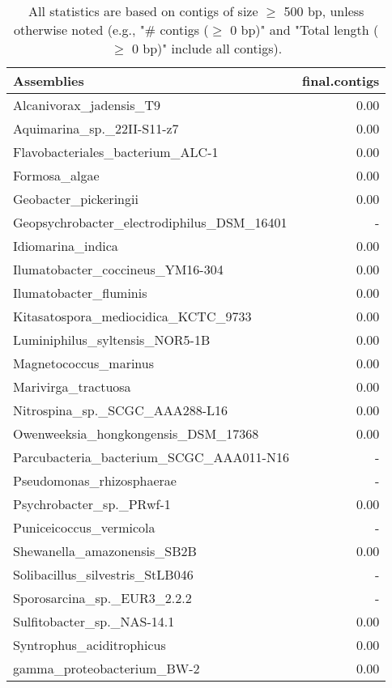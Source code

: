 \documentclass[12pt,a4paper]{article}
\begin{document}
\begin{table}[ht]
\begin{center}
\caption{All statistics are based on contigs of size $\geq$ 500 bp, unless otherwise noted (e.g., "\# contigs ($\geq$ 0 bp)" and "Total length ($\geq$ 0 bp)" include all contigs).}
\begin{tabular}{|l*{1}{|r}|}
\hline
Assemblies & final.contigs \\ \hline
Alcanivorax\_jadensis\_T9 & 0.00 \\ \hline
Aquimarina\_sp.\_22II-S11-z7 & 0.00 \\ \hline
Flavobacteriales\_bacterium\_ALC-1 & 0.00 \\ \hline
Formosa\_algae & 0.00 \\ \hline
Geobacter\_pickeringii & 0.00 \\ \hline
Geopsychrobacter\_electrodiphilus\_DSM\_16401 & - \\ \hline
Idiomarina\_indica & 0.00 \\ \hline
Ilumatobacter\_coccineus\_YM16-304 & 0.00 \\ \hline
Ilumatobacter\_fluminis & 0.00 \\ \hline
Kitasatospora\_mediocidica\_KCTC\_9733 & 0.00 \\ \hline
Luminiphilus\_syltensis\_NOR5-1B & 0.00 \\ \hline
Magnetococcus\_marinus & 0.00 \\ \hline
Marivirga\_tractuosa & 0.00 \\ \hline
Nitrospina\_sp.\_SCGC\_AAA288-L16 & 0.00 \\ \hline
Owenweeksia\_hongkongensis\_DSM\_17368 & 0.00 \\ \hline
Parcubacteria\_bacterium\_SCGC\_AAA011-N16 & - \\ \hline
Pseudomonas\_rhizosphaerae & - \\ \hline
Psychrobacter\_sp.\_PRwf-1 & 0.00 \\ \hline
Puniceicoccus\_vermicola & - \\ \hline
Shewanella\_amazonensis\_SB2B & 0.00 \\ \hline
Solibacillus\_silvestris\_StLB046 & - \\ \hline
Sporosarcina\_sp.\_EUR3\_2.2.2 & - \\ \hline
Sulfitobacter\_sp.\_NAS-14.1 & 0.00 \\ \hline
Syntrophus\_aciditrophicus & 0.00 \\ \hline
gamma\_proteobacterium\_BW-2 & 0.00 \\ \hline
\end{tabular}
\end{center}
\end{table}
\end{document}
